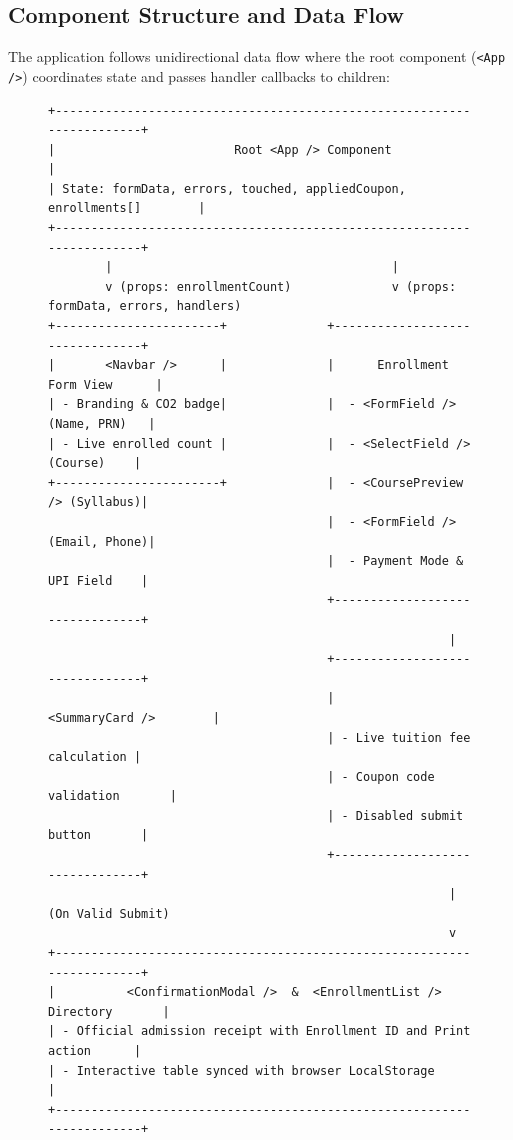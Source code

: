 \documentclass[11pt,a4paper]{article}
\begin{document}
\subsection{Component Structure and Data Flow}
The application follows unidirectional data flow where the root component (\texttt{<App />}) coordinates state and passes handler callbacks to children:

\begin{figure}[htbp]
\centering
\begin{tcolorbox}[colback=codebg,colframe=collegeblue,arc=2mm,title=\textbf{Figure 1: React Component Hierarchy and Props Data Flow}]
\small
\begin{verbatim}
+-----------------------------------------------------------------------+
|                         Root <App /> Component                        |
| State: formData, errors, touched, appliedCoupon, enrollments[]        |
+-----------------------------------------------------------------------+
        |                                       |
        v (props: enrollmentCount)              v (props: formData, errors, handlers)
+-----------------------+              +--------------------------------+
|       <Navbar />      |              |      Enrollment Form View      |
| - Branding & CO2 badge|              |  - <FormField /> (Name, PRN)   |
| - Live enrolled count |              |  - <SelectField /> (Course)    |
+-----------------------+              |  - <CoursePreview /> (Syllabus)|
                                       |  - <FormField /> (Email, Phone)|
                                       |  - Payment Mode & UPI Field    |
                                       +--------------------------------+
                                                        |
                                       +--------------------------------+
                                       |         <SummaryCard />        |
                                       | - Live tuition fee calculation |
                                       | - Coupon code validation       |
                                       | - Disabled submit button       |
                                       +--------------------------------+
                                                        | (On Valid Submit)
                                                        v
+-----------------------------------------------------------------------+
|          <ConfirmationModal />  &  <EnrollmentList /> Directory       |
| - Official admission receipt with Enrollment ID and Print action      |
| - Interactive table synced with browser LocalStorage                  |
+-----------------------------------------------------------------------+
\end{verbatim}
\end{tcolorbox}
\end{figure}
\end{document}
